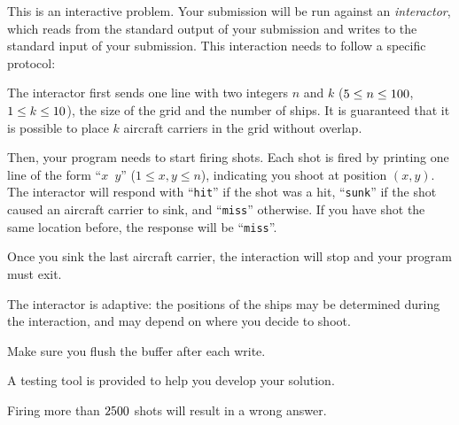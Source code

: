 \begin{Interaction}
    This is an interactive problem.
    Your submission will be run against an \emph{interactor},
    which reads from the standard output of your submission
    and writes to the standard input of your submission.
    This interaction needs to follow a specific protocol:

    The interactor first sends
    one line with two integers $n$ and $k$ ($5 \le n \le 100$, $1 \le k \le 10$),
    the size of the grid and the number of ships.
    It is guaranteed that it is possible to place $k$ aircraft carriers in the grid without overlap.

    Then, your program needs to start firing shots.
    Each shot is fired by printing one line of the form ``\texttt{$x$~$y$}'' ($1 \le x,y \le n$),
    indicating you shoot at position $(x, y)$.
    The interactor will respond with ``\texttt{hit}'' if the shot was a hit,
    ``\texttt{sunk}'' if the shot caused an aircraft carrier to sink, and ``\texttt{miss}'' otherwise.
    If you have shot the same location before,
    the response will be ``\texttt{miss}''.

    Once you sink the last aircraft carrier,
    the interaction will stop and your program must exit.

    The interactor is adaptive:
    the positions of the ships may be determined during the interaction,
    and may depend on where you decide to shoot.

    Make sure you flush the buffer after each write.

    A testing tool is provided to help you develop your solution.

    Firing more than $2500$ shots will result in a wrong answer.
\end{Interaction}
